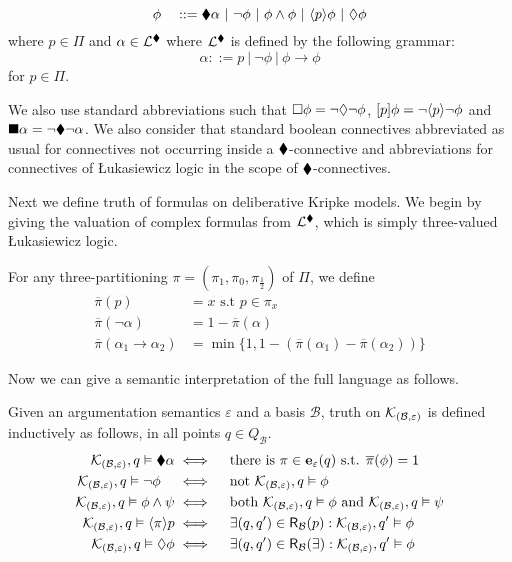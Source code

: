 \documentclass{llncs}
\newcommand{\dlangm}{{\mathcal L}_{\acro{DDL}}}
\newcommand{\pis}[1]{{\mathbf e}_{#1}}
\newcommand{\carriers}[1]{Q_{#1}}
\newcommand{\kmod}[2]{{\cal K}_{(#1,#2)}}
\newcommand{\rels}[1]{{\sf R_{#1}}}
\newcommand{\views}{\mathcal B}
\newcommand{\sem}{\varepsilon}
\begin{document}
$$ \phi \quad ::= \blacklozenge \alpha ~|~ \neg \phi ~|~ \phi \wedge \phi ~|~ \langle{p}\rangle \phi ~|~ \lozenge \phi$$ 
where $p \in \Pi$ and $\alpha \in \mathcal L^{\blacklozenge}$ where $\mathcal L^{\blacklozenge}$ is defined by the following grammar:
$$
\alpha ::= p \ | \ \neg \phi \ | \ \phi \to \phi $$
for $p \in \Pi$.

We also use standard abbreviations such that $\square \phi = \neg \lozenge \neg \phi$, $[p] \phi = \neg \langle{p}\rangle \neg \phi$ and $\blacksquare \alpha = \neg \blacklozenge \neg \alpha$. We also consider that standard boolean connectives abbreviated as usual for connectives not occurring inside a $\blacklozenge$-connective and abbreviations for connectives of {\L}ukasiewicz logic in the scope of $\blacklozenge$-connectives.

Next we define truth of formulas on deliberative Kripke models. We begin by giving the valuation of complex formulas from $\mathcal L^{\blacklozenge}$, which is simply three-valued {\L}ukasiewicz logic.

\begin{definition} For any three-partitioning $\pi = (\pi_1,\pi_0,\pi_{\frac{1}{2}})$ of $\Pi$, we define 
\begin{align*}
\overline \pi(p) &= x \text{ s.t } p \in \pi_x \\
\overline\pi(\neg\alpha) &= 1 - \overline\pi(\alpha)\\
\overline\pi(\alpha_1 \to \alpha_2) &= \min \{1, 1 - (\overline\pi(\alpha_1) - \overline\pi(\alpha_2))\} 
\end{align*}
\end{definition}

Now we can give a semantic interpretation of the full language as follows.

\begin{definition}[$\dlangm$-satisfaction]\label{def:ddlm}
Given an argumentation semantics $\sem$ and a basis $\views$, truth on $\kmod \views \sem$ is defined inductively as follows, in all points $q \in \carriers \views$.
\begin{align*}
\kmod \views \sem, q \vDash \cdia \alpha & \iff \quad \text{there is } \pi \in \pis \sem(q) \text{ s.t. } \overline\pi(\phi) = 1 \\
\kmod \views \sem, q \vDash \neg \phi \quad & \iff \quad \text{not } \kmod \views \sem, q \vDash \phi \\
\kmod \views \sem, q \vDash \phi \wedge \psi & \iff \quad  \text{both } \kmod \views \sem, q \vDash \phi \text{ and } \kmod \views \sem, q \vDash \psi \\
\kmod \views \sem, q \vDash \ddia \pi p & \iff \quad \exists (q,q') \in \rels \views(p): \kmod \views \sem,q' \vDash \phi \\
\kmod \views \sem, q \vDash \adia \phi & \iff \quad \exists (q,q') \in \rels \views(\exists): \kmod \views \sem,q' \vDash \phi \\
\end{align*}
\end{definition}
\end{document}
